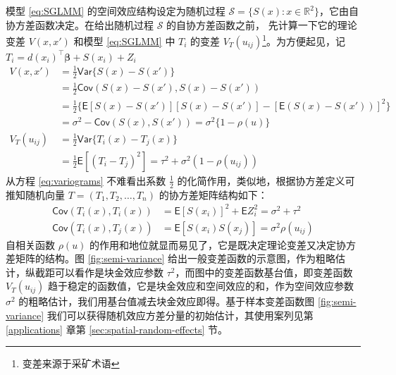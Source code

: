 \documentclass[12pt,a4paper,UTF8,twoside]{book}
\theoremstyle{definition}
\theoremstyle{definition}
\theoremstyle{definition}
\theoremstyle{remark}
\begin{document}
模型 \eqref{eq:SGLMM} 的空间效应结构设定为随机过程 \(\mathcal{S} = \{S(x): x \in \mathbb{R}^2\}\)，它由自协方差函数决定。在给出随机过程 \(\mathcal{S}\) 的自协方差函数之前， 先计算一下它的理论变差 \(V(x,x')\) 和模型 \eqref{eq:SGLMM} 中 \(T_{i}\) 的变差 \(V_{T}(u_{ij})\)\footnote{变差来源于采矿术语\citep{Krige1951}}。为方便起见，记 \(T_{i} = d(x_i)^{\top}\boldsymbol{\beta} + S(x_i) + Z_i\)
\begin{equation}
\begin{aligned}
V(x,x') 
      &= \frac{1}{2}\mathsf{Var}\{S(x)-S(x')\}\\
      &= \frac{1}{2}\mathsf{Cov}(S(x)-S(x'),S(x)-S(x'))\\
      &= \frac{1}{2}\{\mathsf{E}[S(x)-S(x')][S(x)-S(x')]-[\mathsf{E}(S(x)-S(x'))]^2\}\\
      &= \sigma^2-\mathsf{Cov}(S(x),S(x'))=\sigma^2\{1-\rho(u)\}\\
V_{T}(u_{ij})
      &= \frac{1}{2}\mathsf{Var}\{T_{i}(x)-T_{j}(x)\} \\
      &= \frac{1}{2}\mathsf{E}[(T_{i}-T_{j})^2]=\tau^2+\sigma^2(1-\rho(u_{ij})) 
\end{aligned} \label{eq:variograms}
\end{equation}
\noindent 从方程 \eqref{eq:variograms} 不难看出系数 \(\frac{1}{2}\) 的化简作用，类似地，根据协方差定义可推知随机向量 \(T = (T_1,T_2,\ldots,T_n)\) 的协方差矩阵结构如下：
\begin{equation}
\begin{aligned}
\mathsf{Cov}(T_{i}(x),T_{i}(x)) &= \mathsf{E}[S(x_i)]^2 + \mathsf{E}Z_{i}^{2}= \sigma^2+\tau^2 \\
\mathsf{Cov}(T_{i}(x),T_{j}(x)) &= \mathsf{E}[S(x_i)S(x_j)]  = \sigma^2\rho(u_{ij})
\end{aligned}
\end{equation}
\noindent 自相关函数 \(\rho(u)\) 的作用和地位就显而易见了，它是既决定理论变差又决定协方差矩阵的结构。图 \ref{fig:semi-variance} 给出一般变差函数的示意图，作为粗略估计，纵截距可以看作是块金效应参数 \(\tau^2\)，而图中的变差函数基台值，即变差函数 \(V_{T}(u_{ij})\) 趋于稳定的函数值，它是块金效应和空间效应的和，作为空间效应参数 \(\sigma^2\) 的粗略估计，我们用基台值减去块金效应即得。基于样本变差函数图 \ref{fig:semi-variance} 我们可以获得随机效应方差分量的初始估计，其使用案列见第 \ref{applications} 章第 \ref{sec:spatial-random-effects} 节。
\end{document}
